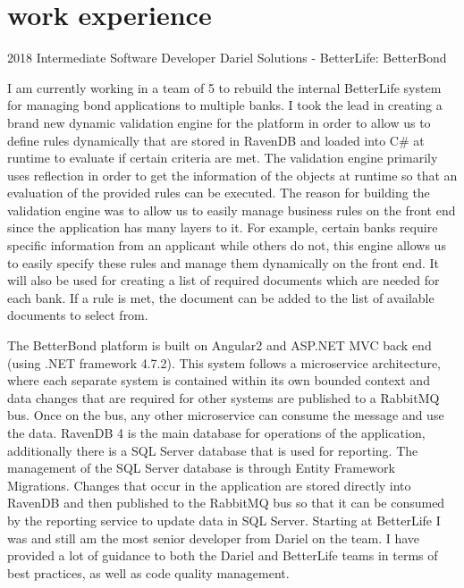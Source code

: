 \documentclass[]{friggeri-cv} %
\begin{document}

\section{work experience}

\begin{entrylist}


\entry
{2018} %
{Intermediate Software Developer}
{Dariel Solutions - BetterLife: BetterBond}
{I am currently working in a team of 5 to rebuild the internal BetterLife system for managing bond applications to multiple banks. I took the lead in creating a brand new dynamic validation engine for the platform in order to allow us to define rules dynamically that are stored in RavenDB and loaded into C\# at runtime to evaluate if certain criteria are met. The validation engine primarily uses reflection in order to get the information of the objects at runtime so that an evaluation of the provided rules can be executed. The reason for building the validation engine was to allow us to easily manage business rules on the front end since the application has many layers to it. For example, certain banks require specific information from an applicant while others do not, this engine allows us to easily specify these rules and manage them dynamically on the front end. It will also be used for creating a list of required documents which are needed for each bank. If a rule is met, the document can be added to the list of available documents to select from.

The BetterBond platform is built on Angular2 and ASP.NET MVC back end (using .NET framework 4.7.2). This system follows a microservice architecture, where each separate system is contained within its own bounded context and data changes that are required for other systems are published to a RabbitMQ bus. Once on the bus, any other microservice can consume the message and use the data. RavenDB 4 is the main database for operations of the application, additionally there is a SQL Server database that is used for reporting. The management of the SQL Server database is through Entity Framework Migrations. Changes that occur in the application are stored directly into RavenDB and then published to the RabbitMQ bus so that it can be consumed by the reporting service to update data in SQL Server. Starting at BetterLife I was and still am the most senior developer from Dariel on the team. I have provided a lot of guidance to both the Dariel and BetterLife teams in terms of best practices, as well as code quality management.}


\end{entrylist}
\end{document}
